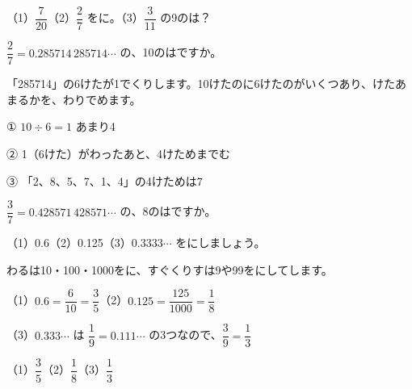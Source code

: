 \begin{jibun}
（1）$\dfrac{7}{20}$\quad（2）$\dfrac{2}{7}$ をに。（3）$\dfrac{3}{11}$ の9のは？
\end{jibun}

\begin{reidai}[くり\R{返}{かえ}しが\R{長}{なが}いときの\R{第}{だい}□\R{位}{い}]
$\dfrac{2}{7}=0.285714\,285714\cdots$ の、10のはですか。\par
\kangaekata 「285714」の6けたが1でくりします。10けたのに6けたのがいくつあり、けたあまるかを、わりでめます。\par
\shiki ① $10\div6=1$ あまり4\par
\hspace*{2.6\zw}② 1（6けた）がわったあと、4けためまでむ\par
\hspace*{2.6\zw}③ 「2、8、5、7、1、4」の4けためは7\par
{}
\end{reidai}

\begin{jibun}
$\dfrac{3}{7}=0.428571\,428571\cdots$ の、8のはですか。
\end{jibun}

\begin{reidai}
（1）0.6\quad（2）0.125\quad（3）$0.3333\cdots$ をにしましょう。\par
\kangaekata {}わるは10・100・1000をに、すぐくりすは9や99をにしてします。\par
\shiki （1）$0.6=\dfrac{6}{10}=\dfrac{3}{5}$\qquad（2）$0.125=\dfrac{125}{1000}=\dfrac{1}{8}$\par
\hspace*{2.6\zw}（3）$0.333\cdots$ は $\dfrac{1}{9}=0.111\cdots$ の3つなので、$\dfrac{3}{9}=\dfrac{1}{3}$\par
\kotae （1）$\dfrac{3}{5}$\quad（2）$\dfrac{1}{8}$\quad（3）$\dfrac{1}{3}$
\end{reidai}


